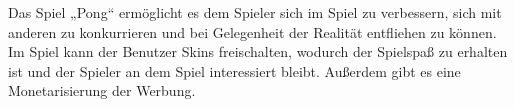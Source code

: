 Das Spiel „Pong“ ermöglicht es dem Spieler sich im Spiel zu verbessern, sich mit anderen zu konkurrieren und bei Gelegenheit der Realität entfliehen zu können.
\\
Im Spiel kann der Benutzer Skins freischalten, wodurch der Spielspaß zu erhalten ist und der Spieler an dem Spiel interessiert bleibt. 
Außerdem gibt es eine Monetarisierung der Werbung.